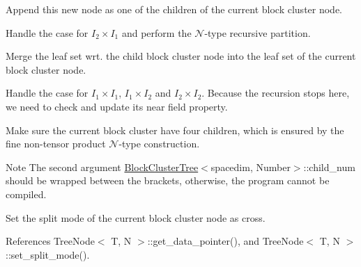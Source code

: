 Append this new node as one of the children of the current block cluster node.

Handle the case for $I_2 \times I_1$ and perform the $\mathcal{N}$-\/type recursive partition.

Merge the leaf set wrt. the child block cluster node into the leaf set of the current block cluster node.

Handle the case for $I_1 \times I_1$, $I_1 \times I_2$ and $I_2 \times I_2$. Because the recursion stops here, we need to check and update its near field property.

Make sure the current block cluster have four children, which is ensured by the fine non-\/tensor product $\mathcal{N}$-\/type construction.


\begin{DoxyDescription}
\item[Note ]The second argument {\ttfamily \hyperlink{classBlockClusterTree}{Block\+Cluster\+Tree}$<$spacedim}, Number$>$\+::child\+\_\+num should be wrapped between the brackets, otherwise, the program cannot be compiled. 
\end{DoxyDescription}

Set the split mode of the current block cluster node as cross.

References Tree\+Node$<$ T, N $>$\+::get\+\_\+data\+\_\+pointer(), and Tree\+Node$<$ T, N $>$\+::set\+\_\+split\+\_\+mode().

\mbox{\label{classBlockClusterTree_afdeb6723e01b5eaf11281e2c1c1cf566}} 
